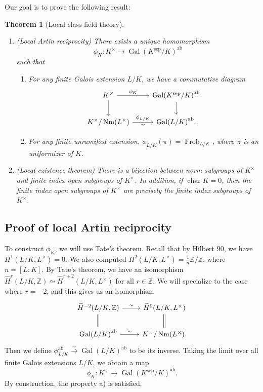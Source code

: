 \documentclass[leqno, openany]{memoir}
\newtheorem{thm}{Theorem}[section]
\theoremstyle{definition}
\theoremstyle{remark}
\theoremstyle{plain}
\theoremstyle{definition}
\theoremstyle{remark}
\newcommand{\Z}{\mathbb{Z}}
\newcommand{\mr}[1]{\mathrm{#1}}
\newcommand{\wh}[1]{\widehat{#1}}
\DeclareMathOperator{\Gal}{Gal}
\DeclareMathOperator{\Nm}{Nm}
\DeclareMathOperator{\Frob}{Frob}
\begin{document}
Our goal is to prove the following result:

\begin{thm}[Local class field theory]\leavevmode \begin{enumerate} \item (Local
    Artin reciprocity) There exists a unique homomorphism \[ \phi_K \colon
        K^{\times} \to {\Gal(K^{\mr{sep}}/K)}^{\mr{ab}} \] such that
        \begin{enumerate} \item For any finite Galois extension $L/K$, we have
            a commutative diagram \begin{equation*} \begin{tikzcd} K^{\times}
            \ar{d} \ar{r}{\phi_K} & {\Gal(K^{\mr{sep}}/K)}^{\mr{ab}} \ar{d} \\
        K^{\times}/\Nm(L^{\times}) \ar{r}{\phi_{L/K}}[swap]{\sim} &
    {\Gal(L/K)}^{\mr{ab}}.  \end{tikzcd} \end{equation*} \item For any finite
    unramified extension, $\phi_{L/K}(\pi) = \Frob_{L/K}$, where $\pi$ is an
    uniformizer of $K$.  \end{enumerate} \item (Local existence theorem) There
    is a bijection between norm subgroups of $K^{\times}$ and finite index open
    subgroups of $K^{\times}$. In addition, if $\operatorname{char} K = 0$,
    then the finite index open subgroups of $K^{\times}$ are precisely the
    finite index subgroups of $K^{\times}$.  \end{enumerate} \end{thm}

\subsection{Proof of local Artin reciprocity}%
\label{sub:proof_of_local_artin_reciprocity}

To construct $\phi_K$, we will use Tate's theorem. Recall that by Hilbert 90,
we have $H^1(L/K, L^{\times}) = 0$. We also computed $H^2(L/K, L^{\times}) =
\frac{1}{n} \Z/\Z$, where $n = [L:K]$. By Tate's theorem, we have an
isomorphism $\wh{H}^r(L/K, \Z) \simeq \wh{H}^{r+2}(L/K, L^{\times})$ for all $r
\in \Z$. We will specialize to the case where $r = -2$, and this gives us an
isomorphism \begin{equation*} \begin{tikzcd} \wh{H}^{-2}(L/K, \Z) \ar[equal]{d}
\ar{r}{\sim} & \wh{H}^0(L/K, L^{\times}) \ar[equal]{d} \\ {\Gal(L/K)}^{\mr{ab}}
\ar{r}{\sim} & K^{\times} / \Nm(L^{\times}).  \end{tikzcd} \end{equation*} Then
we define $\phi_{L/K}^{\mr{ab}} \xrightarrow{\sim} {\Gal(L/K)}^{\mr{ab}}$ to be
its inverse. Taking the limit over all finite Galois extensions $L/K$, we
obtain a map \[ \phi_K \colon K^{\times} \to {\Gal(K^{\mr{sep}}/K)}^{\mr{ab}}.
\] By construction, the property a) is satisfied.
\end{document}
